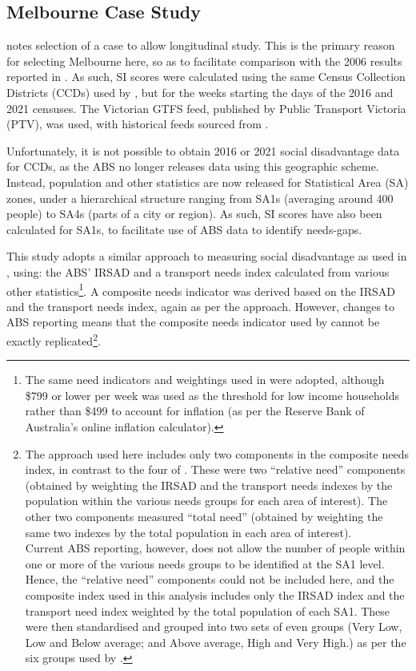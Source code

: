 \documentclass[preprint, 3p,
authoryear]{elsarticle} %
\begin{document}
\subsection{Melbourne Case Study}\label{melbourne-case-study}

\citet{Yin2009aa} notes selection of a case to allow longitudinal study.
This is the primary reason for selecting Melbourne here, so as to
facilitate comparison with the 2006 results reported in
\citet{currie2010identifying}. As such, SI scores were calculated using
the same Census Collection Districts (CCDs) used by
\citet{currie2010identifying}, but for the weeks starting the days of
the 2016 and 2021 censuses. The Victorian GTFS feed, published by Public
Transport Victoria (PTV), was used, with historical feeds sourced from
\citet{transitfeeds_victoria:2023aa}.

Unfortunately, it is not possible to obtain 2016 or 2021 social
disadvantage data for CCDs, as the ABS no longer releases data using
this geographic scheme. Instead, population and other statistics are now
released for Statistical Area (SA) zones, under a hierarchical structure
ranging from SA1s (averaging around 400 people) to SA4s (parts of a city
or region)\citep{ABSmaps}. As such, SI scores have also been calculated
for SA1s, to facilitate use of ABS data to identify needs-gaps.

This study adopts a similar approach to measuring social disadvantage as
used in \citet{currie2010identifying}, using: the ABS' IRSAD and a
transport needs index calculated from various other
statistics\footnote{The same need indicators and weightings used in
  \citet{currie2010identifying} were adopted, although \$799 or lower
  per week was used as the threshold for low income households rather
  than \$499 to account for inflation (as per the Reserve Bank of
  Australia's online inflation calculator).}. A composite needs
indicator was derived based on the IRSAD and the transport needs index,
again as per the \citet{currie2010identifying} approach. However,
changes to ABS reporting means that the composite needs indicator used
by \citet{currie2010identifying} cannot be exactly
replicated\footnote{The approach used here includes only two components
  in the composite needs index, in contrast to the four of
  \citet{currie2010identifying}. These were two ``relative need''
  components (obtained by weighting the IRSAD and the transport needs
  indexes by the population within the various needs groups for each
  area of interest). The other two components measured ``total need''
  (obtained by weighting the same two indexes by the total population in
  each area of interest).\\
  Current ABS reporting, however, does not allow the number of people
  within one or more of the various needs groups to be identified at the
  SA1 level. Hence, the ``relative need'' components could not be
  included here, and the composite index used in this analysis includes
  only the IRSAD index and the transport need index weighted by the
  total population of each SA1. These were then standardised and grouped
  into two sets of even groups (Very Low, Low and Below average; and
  Above average, High and Very High.) as per the six groups used by
  \citet{currie2010identifying}.}.
\end{document}
